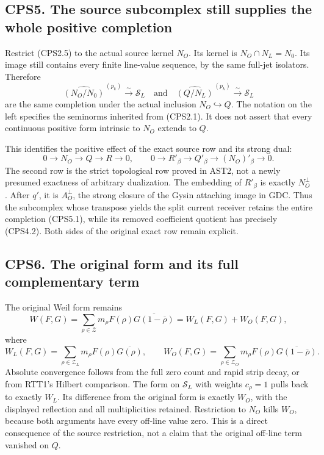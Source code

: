 \subsection{CPS5. The source subcomplex still supplies the whole
positive
completion}\label{cps5.-the-source-subcomplex-still-supplies-the-whole-positive-completion}

Restrict (CPS2.5) to the actual source kernel \(N_O\). Its kernel is
\(N_O\cap N_L=N_0\). Its image still contains every finite line-value
sequence, by the same full-jet isolators. Therefore \[
\widehat{(N_O/N_0)}^{\,(p_k)}\xrightarrow{\sim}\mathcal S_L
\quad\text{and}\quad
\widehat{(Q/N_L)}^{\,(p_k)}\xrightarrow{\sim}\mathcal S_L
\tag{CPS5.1}
\] are the same completion under the actual inclusion
\(N_O\hookrightarrow Q\). The notation on the left specifies the
seminorms inherited from (CPS2.1). It does not assert that every
continuous positive form intrinsic to \(N_O\) extends to \(Q\).

This identifies the positive effect of the exact source row and its
strong dual: \[
0\longrightarrow N_O\longrightarrow Q\longrightarrow R\longrightarrow0,
\qquad
0\longrightarrow R'_\beta\longrightarrow Q'_\beta
\longrightarrow (N_O)'_\beta\longrightarrow0.
\tag{CPS5.2}
\] The second row is the strict topological row proved in AST2, not a
newly presumed exactness of arbitrary dualization. The embedding of
\(R'_\beta\) is exactly \(N_O^\perp\). After \(q'\), it is
\(A_O^\perp\), the strong closure of the Gysin attaching image in GDC.
Thus the subcomplex whose transpose yields the split current receiver
retains the entire completion (CPS5.1), while its removed coefficient
quotient has precisely (CPS4.2). Both sides of the original exact row
remain explicit.

\subsection{CPS6. The original form and its full complementary
term}\label{cps6.-the-original-form-and-its-full-complementary-term}

The original Weil form remains \[
W(F,G)=\sum_{\rho\in\mathscr Z}m_\rho
F(\rho)\overline{G(1-\overline\rho)}
=W_L(F,G)+W_O(F,G),
\tag{CPS6.1}
\] where \[
W_L(F,G)=\sum_{\rho\in\mathscr Z_L}m_\rho
F(\rho)\overline{G(\rho)},\qquad
W_O(F,G)=\sum_{\rho\in\mathscr Z_O}m_\rho
F(\rho)\overline{G(1-\overline\rho)}.
\tag{CPS6.2}
\] Absolute convergence follows from the full zero count and rapid strip
decay, or from RTT1's Hilbert comparison. The form on \(\mathcal S_L\)
with weights \(c_\rho=1\) pulls back to exactly \(W_L\). Its difference
from the original form is exactly \(W_O\), with the displayed reflection
and all multiplicities retained. Restriction to \(N_O\) kills \(W_O\),
because both arguments have every off-line value zero. This is a direct
consequence of the source restriction, not a claim that the original
off-line term vanished on \(Q\).

